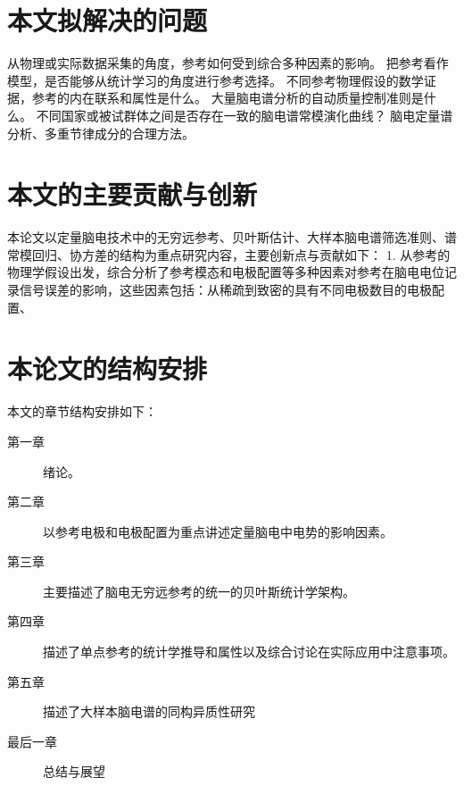 \section{本文拟解决的问题}
从物理或实际数据采集的角度，参考如何受到综合多种因素的影响。
把参考看作模型，是否能够从统计学习的角度进行参考选择。
不同参考物理假设的数学证据，参考的内在联系和属性是什么。
大量脑电谱分析的自动质量控制准则是什么。
不同国家或被试群体之间是否存在一致的脑电谱常模演化曲线？
脑电定量谱分析、多重节律成分的合理方法。

\section{本文的主要贡献与创新}
本论文以定量脑电技术中的无穷远参考、贝叶斯估计、大样本脑电谱筛选准则、谱常模回归、协方差的结构为重点研究内容，主要创新点与贡献如下：
1. 从参考的物理学假设出发，综合分析了参考模态和电极配置等多种因素对参考在脑电电位记录信号误差的影响，这些因素包括：从稀疏到致密的具有不同电极数目的电极配置、

\section{本论文的结构安排}
本文的章节结构安排如下：
\begin{description}
	\item[第一章] 绪论。
	\item[第二章] 以参考电极和电极配置为重点讲述定量脑电中电势的影响因素。
	\item[第三章] 主要描述了脑电无穷远参考的统一的贝叶斯统计学架构。
	\item[第四章] 描述了单点参考的统计学推导和属性以及综合讨论在实际应用中注意事项。
	\item[第五章] 描述了大样本脑电谱的同构异质性研究
	\item[最后一章] 总结与展望
\end{description}
